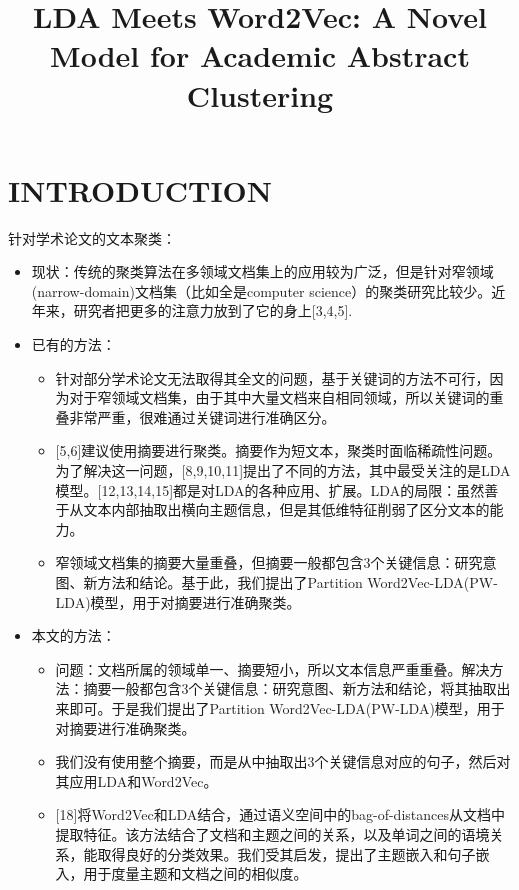 \documentclass{article}
\begin{document}
\title{LDA Meets Word2Vec: A Novel Model for Academic Abstract Clustering}
\date{}
\maketitle

\section{INTRODUCTION}
针对学术论文的文本聚类：
\begin{itemize}
	\item 现状：传统的聚类算法在多领域文档集上的应用较为广泛，但是针对窄领域(narrow-domain)文档集（比如全是computer science）的聚类研究比较少。近年来，研究者把更多的注意力放到了它的身上[3,4,5].
	\item 已有的方法：
	\begin{itemize}
		\item 针对部分学术论文无法取得其全文的问题，基于关键词的方法不可行，因为对于窄领域文档集，由于其中大量文档来自相同领域，所以关键词的重叠非常严重，很难通过关键词进行准确区分。
		\item {[5,6]建议使用摘要进行聚类。摘要作为短文本，聚类时面临稀疏性问题。为了解决这一问题，[8,9,10,11]提出了不同的方法，其中最受关注的是LDA模型。[12,13,14,15]都是对LDA的各种应用、扩展。LDA的局限：虽然善于从文本内部抽取出横向主题信息，但是其低维特征削弱了区分文本的能力。}
		\item 窄领域文档集的摘要大量重叠，但摘要一般都包含3个关键信息：研究意图、新方法和结论。基于此，我们提出了Partition Word2Vec-LDA(PW-LDA)模型，用于对摘要进行准确聚类。
	\end{itemize}
	\item 本文的方法：
	\begin{itemize}
		\item 问题：文档所属的领域单一、摘要短小，所以文本信息严重重叠。解决方法：摘要一般都包含3个关键信息：研究意图、新方法和结论，将其抽取出来即可。于是我们提出了Partition Word2Vec-LDA(PW-LDA)模型，用于对摘要进行准确聚类。
		\item 我们没有使用整个摘要，而是从中抽取出3个关键信息对应的句子，然后对其应用LDA和Word2Vec。
		\item {[18]将Word2Vec和LDA结合，通过语义空间中的bag-of-distances从文档中提取特征。该方法结合了文档和主题之间的关系，以及单词之间的语境关系，能取得良好的分类效果。我们受其启发，提出了主题嵌入和句子嵌入，用于度量主题和文档之间的相似度。}
	\end{itemize}
\end{itemize}
\end{document}

